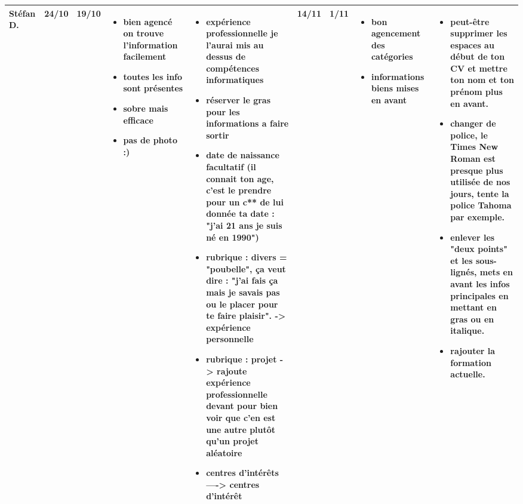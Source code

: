 \documentclass[a4paper,11pt]{article}
\begin{document}
\begin{landscape}
\begin{longtable}{|l|l|l|p{4cm}|p{4cm}|l|l|p{4cm}|p{4cm}|}
    Stéfan D. & 24/10 & 19/10
			  & \begin{itemize}
				\item bien agencé on trouve l'information facilement
				\item toutes les info sont présentes
				\item sobre mais efficace
				\item pas de photo :)
				\end{itemize}
			  & \begin{itemize}
				\item expérience professionnelle je l'aurai mis au dessus de compétences informatiques
				\item réserver le gras pour les informations a faire sortir
				\item date de naissance facultatif (il connait ton age, c'est le prendre pour un c** de lui donnée ta date : "j'ai 21 ans je suis né en 1990")
				\item rubrique : divers = "poubelle", ça veut dire : "j'ai fais ça mais je savais pas ou le placer pour te faire plaisir". -> expérience personnelle
				\item rubrique : projet -> rajoute expérience professionnelle devant pour bien voir que c'en est une autre plutôt qu'un projet aléatoire
				\item centres d’intérêts ----> centres d’intérêt
				\end{itemize}
			  & 14/11 & 1/11
			  & \begin{itemize}
				\item bon agencement des catégories
				\item informations biens mises en avant
				\end{itemize}
			  & \begin{itemize}
				\item peut-être supprimer les espaces au début de ton CV et mettre ton nom et ton prénom plus en avant.
				\item changer de police, le Times New Roman est presque plus utilisée de nos jours, tente la police Tahoma par exemple.
				\item enlever les "deux points" et les sous-lignés, mets en avant les infos principales en mettant en gras ou en italique.
				\item rajouter la formation actuelle.
				\end{itemize} \\ \hline


\end{longtable}
\end{landscape}
\end{document}
